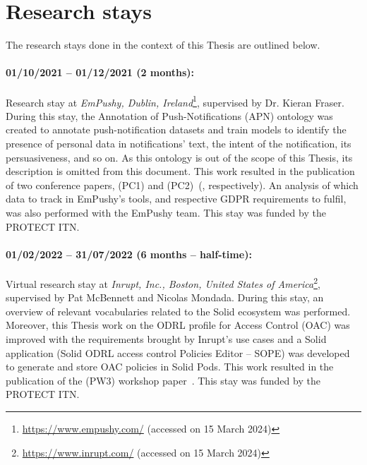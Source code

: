 \section{Research stays}
\label{sec:research_stays}

The research stays done in the context of this Thesis are outlined below.

\paragraph{01/10/2021 -- 01/12/2021 (2 months):} Research stay at \textit{EmPushy, Dublin, Ireland}\footnote{\url{https://www.empushy.com/} (accessed on 15 March 2024)}, supervised by Dr. Kieran Fraser. During this stay, the Annotation of Push-Notifications (APN) ontology was created to annotate push-notification datasets and train models to identify the presence of personal data in notifications' text, the intent of the notification, its persuasiveness, and so on. As this ontology is out of the scope of this Thesis, its description is omitted from this document. This work resulted in the publication of two conference papers, (PC1) and (PC2)~(\cite{esteves_extracting_2022, esteves_now_2022}, respectively). An analysis of which data to track in EmPushy's tools, and respective GDPR requirements to fulfil, was also performed with the EmPushy team. This stay was funded by the PROTECT ITN.

\paragraph{01/02/2022 -- 31/07/2022 (6 months -- half-time):} Virtual research stay at \textit{Inrupt, Inc., Boston, United States of America}\footnote{\url{https://www.inrupt.com/} (accessed on 15 March 2024)}, supervised by Pat McBennett and Nicolas Mondada. During this stay, an overview of relevant vocabularies related to the Solid ecosystem was performed. Moreover, this Thesis work on the ODRL profile for Access Control (OAC) was improved with the requirements brought by Inrupt's use cases and a Solid application (Solid ODRL access control Policies Editor -- SOPE) was developed to generate and store OAC policies in Solid Pods. This work resulted in the publication of the (PW3) workshop paper~\citep{esteves_using_2022}. This stay was funded by the PROTECT ITN.

